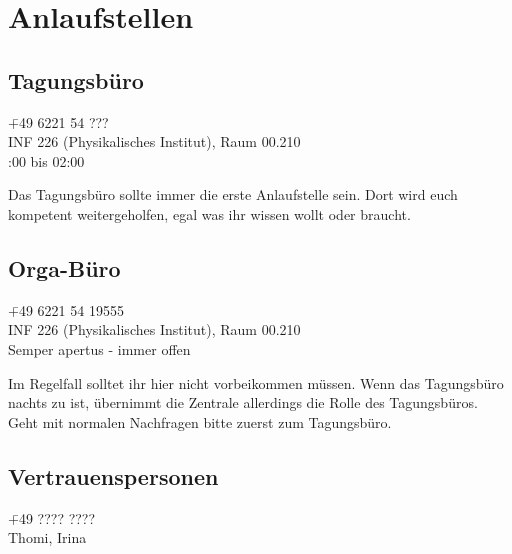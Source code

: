 
\section{Anlaufstellen}

\subsection{Tagungsbüro}
\begin{tabbing}
\faPhone \quad \quad \quad \= +49 6221 54 ???\\ %
\faMapPin \> INF 226 (Physikalisches Institut), Raum 00.210\\ %
\faClockO {}:00 bis 02:00 %
\end{tabbing}

\noindent Das Tagungsbüro sollte immer die erste Anlaufstelle sein. Dort wird euch kompetent weitergeholfen, egal was ihr wissen wollt oder braucht.

\subsection{Orga-Büro}
\begin{tabbing}
\faPhone \quad \quad \quad \= +49 6221 54 19555\\
\faMapPin \> INF 226 (Physikalisches Institut), Raum 00.210\\
\faClockO \> Semper apertus - immer offen
\end{tabbing}

\noindent Im Regelfall solltet ihr hier nicht vorbeikommen müssen. Wenn das Tagungsbüro nachts zu ist, übernimmt die Zentrale allerdings die Rolle des Tagungsbüros. Geht mit normalen Nachfragen bitte zuerst zum Tagungsbüro. %

\subsection{Vertrauenspersonen}
\begin{tabbing}
\faPhone \quad \quad \quad \= +49 ???? ????\\ %
\faUsers \> Thomi, Irina \\ %
\end{tabbing}

